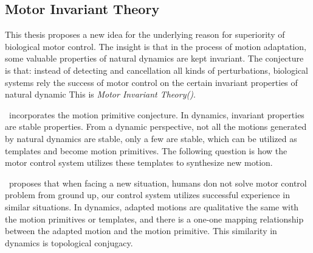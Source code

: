 \subsection{Motor Invariant Theory}
%
%
%





This thesis proposes a new idea for the underlying reason for superiority of biological motor control.
The insight is that in the process of motion adaptation, some valuable properties of natural dynamics are kept invariant.
The conjecture is that:  instead of detecting and cancellation all kinds of perturbations, biological systems rely the success of motor control on the certain invariant properties of natural dynamic 
This is \emph{Motor Invariant Theory({\moit})}.


{\moit}\ incorporates the motion primitive conjecture.
In dynamics, invariant properties are stable properties.
From a dynamic perspective, not all the motions generated by natural dynamics are stable, only a few are stable, which can be utilized as templates and become motion primitives.
The following question is how the motor control system utilizes these templates to synthesize new motion.

{\moit}\ proposes that when facing a new situation, humans don not solve motor control problem from ground up,
our control system utilizes successful experience in similar situations.
In dynamics, adapted motions are qualitative the same with the motion primitives or templates, and there is a one-one mapping relationship between the adapted motion and the motion primitive.
This similarity in dynamics is topological conjugacy. 

